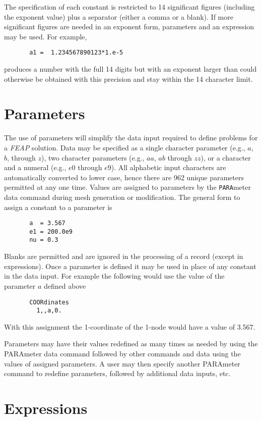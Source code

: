 The specification of each constant is restricted to 14
significant figures (including the exponent value) plus a separator (either
a comma or a blank).  If more
significant figures are needed in an exponent form, parameters and
an expression may be used.  For example,
\begin{verbatim}
       a1 =  1.234567890123*1.e-5
\end{verbatim}
produces a number with the full 14 digits but with an exponent larger than
could otherwise be obtained with this precision and stay within the
14 character limit.

\section{Parameters}

The use of parameters will simplify the data input
required to define problems for a {\sl FEAP} solution.
Data may be specified as a single character parameter
(e.g., $a$, $b$, through $z$), two character parameters
(e.g., $aa$, $ab$ through $zz$), or a character and a numeral
(e.g., $e0$ through $e9$).  All alphabetic input
characters are automatically converted to lower case, hence there are 962
unique parameters permitted at any one time.  Values are
assigned to parameters by the {\tt PARA}meter data command during mesh
generation or modification.  The general form to assign a constant
to a parameter is
\begin{verbatim}
       a  = 3.567
       e1 = 200.0e9
       nu = 0.3
\end{verbatim}
Blanks are permitted and are ignored in the processing of a
record (except in expressions).
Once a parameter is defined it may be used in place of
any constant in the data input.  For example the following would use
the value of the parameter $a$ defined above
\begin{verbatim}
       COORdinates
         1,,a,0.
\end{verbatim}
With this assignment the 1-coordinate of the 1-node would have a
value of 3.567.

Parameters may have their values redefined as many times as
needed by using the PARAmeter data command followed by other commands
and data using the values of assigned parameters.  A user may then
specify another
PARAmeter command to redefine parameters, followed by additional
data inputs, etc.

\section{Expressions}


